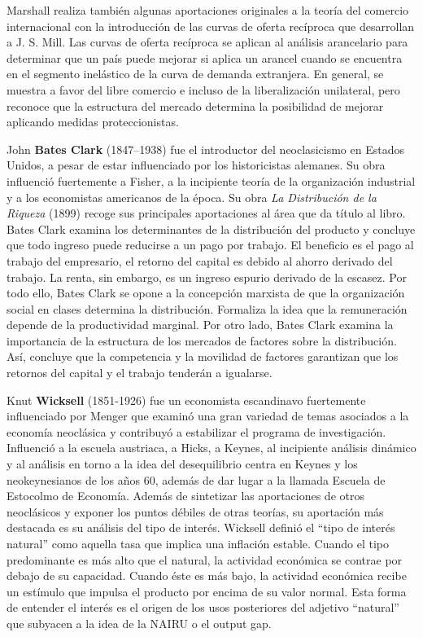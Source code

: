 \documentclass{nuevotema}
\begin{document}
Marshall realiza también algunas aportaciones originales a la teoría del comercio internacional con la introducción de las curvas de oferta recíproca que desarrollan a J. S. Mill. Las curvas de oferta recíproca se aplican al análisis arancelario para determinar que un país puede mejorar si aplica un arancel cuando se encuentra en el segmento inelástico de la curva de demanda extranjera. En general, se muestra a favor del libre comercio e incluso de la liberalización unilateral, pero reconoce que la estructura del mercado determina la posibilidad de mejorar aplicando medidas proteccionistas.

John \textbf{Bates Clark} (1847--1938) fue el introductor del neoclasicismo en Estados Unidos, a pesar de estar influenciado por los historicistas alemanes. Su obra influenció fuertemente a Fisher, a la incipiente teoría de la organización industrial y a los economistas americanos de la época. Su obra \textit{La Distribución de la Riqueza} (1899) recoge sus principales aportaciones al área que da título al libro. Bates Clark examina los determinantes de la distribución del producto y concluye que todo ingreso puede reducirse a un pago por trabajo. El beneficio es el pago al trabajo del empresario, el retorno del capital es debido al ahorro derivado del trabajo. La renta, sin embargo, es un ingreso espurio derivado de la escasez. Por todo ello, Bates Clark se opone a la concepción marxista de que la organización social en clases determina la distribución. Formaliza la idea que la remuneración depende de la productividad marginal. Por otro lado, Bates Clark examina la importancia de la estructura de los mercados de factores sobre la distribución. Así, concluye que la competencia y la movilidad de factores garantizan que los retornos del capital y el trabajo tenderán a igualarse.

Knut \textbf{Wicksell} (1851-1926) fue un economista escandinavo fuertemente influenciado por Menger que examinó una gran variedad de temas asociados a la economía neoclásica y contribuyó a estabilizar el programa de investigación. Influenció a la escuela austriaca, a Hicks, a Keynes, al incipiente análisis dinámico y al análisis en torno a la idea del desequilibrio centra en Keynes y los neokeynesianos de los años 60, además de dar lugar a la llamada Escuela de Estocolmo de Economía. Además de sintetizar las aportaciones de otros neoclásicos y exponer los puntos débiles de otras teorías, su aportación más destacada es su análisis del tipo de interés. Wicksell definió el ``tipo de interés natural'' como aquella tasa que implica una inflación estable. Cuando el tipo predominante es más alto que el natural, la actividad económica se contrae por debajo de su capacidad. Cuando éste es más bajo, la actividad económica recibe un estímulo que impulsa el producto por encima de su valor normal. Esta forma de entender el interés es el origen de los usos posteriores del adjetivo ``natural'' que subyacen a la idea de la NAIRU o el output gap.
\end{document}
